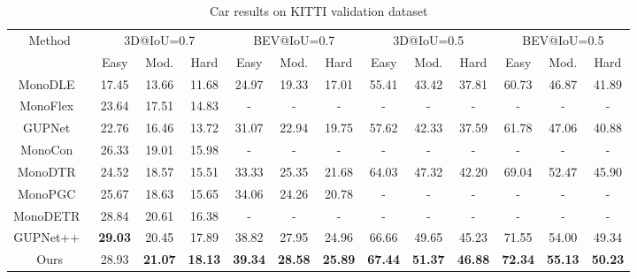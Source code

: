 \documentclass[journal]{IEEEtran}
\begin{document}
\begin{table}[]
	\centering
	\caption{{Car results on KITTI validation dataset}}
	\label{tab:kitti_valid}
	{%
		\begin{tabular}{ccccccccccccc}
			\toprule%
			\multirow{2}{*}{{Method}} & \multicolumn{3}{c}{{3D@IoU=0.7}} & \multicolumn{3}{c}{{BEV@IoU=0.7}}  & \multicolumn{3}{c}{{3D@IoU=0.5}} & \multicolumn{3}{c}{{BEV@IoU=0.5}}\\ \cline{2-13}
			& {Easy}           & {Mod.}           & {Hard}   & {Easy}           & {Mod.}           & {Hard} & {Easy}           & {Mod.}           & {Hard} & {Easy}           & {Mod.}           & {Hard}                        \\ 
			\midrule%
			{MonoDLE~\cite{monodle}}			& {17.45}	& {13.66}	& {11.68}	& 24.97 & 19.33 & 17.01 & 55.41 & 43.42 & 37.81 & 60.73 & 46.87 & 41.89 	\\
			{MonoFlex~\cite{monoflex}}			& {23.64}	& {17.51}   & {14.83}  & - & - & - & - & - & - & - & - & -  	\\
			{GUPNet~\cite{gupnet}}            	& {22.76}   & {16.46}   & {13.72}  & 31.07 & 22.94 & 19.75 & 57.62 & 42.33 & 37.59 & 61.78 & 47.06 & 40.88 	\\
			{MonoCon~\cite{monocon}}         	& {26.33}   & {19.01}   & {15.98}  & - & - & - & - & - & - & - & - & -  	\\
			{MonoDTR~\cite{monodtr}}         	& {24.52}   & {18.57}   & {15.51}  & 33.33 & 25.35 & 21.68 & 64.03 & 47.32 & 42.20 & 69.04 & 52.47 & 45.90 	\\
			{MonoPGC~\cite{monopgc}}         	& {25.67}   & {18.63}   & {15.65}  & 34.06 & 24.26 & 20.78 & - & - & - & - & - & -  	\\
			{MonoDETR~\cite{monodetr}} & 28.84 & 20.61 & 16.38 & - & - & - & - & - & - & - & - & -  	\\
			
			{GUPNet++~\cite{gupnet++}}         	& \textbf{29.03}   & {20.45}   & {17.89}  & 38.82 & 27.95 & 24.96 & 66.66 & 49.65 & 45.23 & 71.55 & 54.00 & 49.34 	\\
			{Ours}         						& {28.93} 		& \textbf{21.07} 		& \textbf{18.13} & \textbf{39.34} 	& \textbf{28.58} & \textbf{25.89} & \textbf{67.44} & \textbf{51.37} & \textbf{46.88} & \textbf{72.34} & \textbf{55.13} & \textbf{50.23}	   	\\ 
			\bottomrule%
		\end{tabular}
	}
\end{table}
\end{document}
